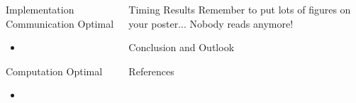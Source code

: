 \documentclass[serif,mathserif,final]{beamer}
\begin{document}
\begin{frame}{}
\begin{columns}[t]
\begin{column}{0.32\linewidth}
      \begin{block}{Implementation}
      Communication Optimal \cite{Driscoll2013}
        \begin{itemize}
          \item 
        \end{itemize}
      Computation Optimal \cite{Koanantakool}
        \begin{itemize}
          \item 
        \end{itemize}
      \end{block}

    \end{column}%

    \begin{column}{0.32\linewidth}

      \begin{block}{Timing Results}
        Remember to put lots of figures on your poster... Nobody reads anymore!
      \end{block}

      \begin{block}{Conclusion and Outlook}
        
      \end{block}

      \begin{block}{References}
        
	{\footnotesize
	}
      \end{block}

    \end{column}%

  \end{columns}
\end{frame}
\end{document}

